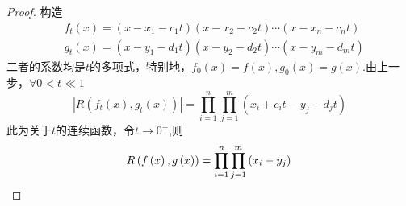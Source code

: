 {\begin{proof}
        构造
        \begin{align*}
             & f_t\left(x\right)=\left(
            x-x_1-c_1t
            \right)\left(
            x-x_2-c_2t
            \right)\cdots\left(
            x-x_n-c_nt
            \right)                     \\
             & g_t\left(x\right)=\left(
            x-y_1-d_1t
            \right)\left(
            x-y_2-d_2t
            \right)\cdots\left(
            x-y_m-d_mt
            \right)
        \end{align*}
        二者的系数均是$t$的多项式，特别地，$f_0\left(x\right)=f\left(x\right),g_0\left(x\right)=g\left(x\right)$.由上一步，$\forall 0<t\ll 1$
        \[
            \left|R\left(
            f_t\left(x\right),g_t\left(x\right)
            \right)\right|=\prod_{i=1}^{n}
            \prod_{j=1}^{m}
            \left(
            x_i+c_it-y_j-d_jt
            \right)
        \]
        此为关于$t$的连续函数，令$t\to 0^+$,则
        \[
            R\left(f\left(x\right),g\left(x\right)\right)=\prod_{i=1}^{n}
            \prod_{j=1}^{m}
            \left(
            x_i-y_j
            \right)\qedhere
        \]
    \end{proof}
}
